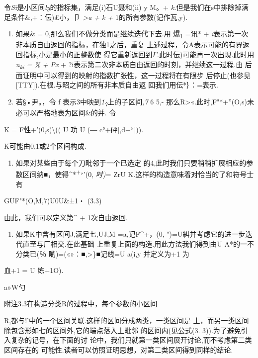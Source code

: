 \documentclass{article}
\begin{document}
令\emph{Si}是小区间\emph{ly}的指标集，满足(i)石U聂和(ii)
\textbar{}y\textbar{} M。+
\emph{k.}但是我们在s中排除掉满足条件\&,+：伝)£小，卩\textbar{}
\emph{\textgreater{}a + k +} 1的所有参数(记作瓦,y).

\begin{enumerate}
\def\labelenumi{(\alph{enumi})}
\item
  如果\& = 0,那么我们不做分类而是继续迭代下去.用 爆\textsubscript{1}
  =讯* + \emph{i}表示第一次非本质自由返回的指标，在独1之后，重复
  上述过程，令A表示可能的有界返回指标,小是最小的正整数使
  得它重新返回到\emph{I'}.此时伝)可能再一次出现.此时用\emph{n\textsubscript{ki}
  = \% + Px} + ?i表示第二次非本质自由返回的时刻，并继续这一过程.由
  后面证明中可以得到的映射的指数扩张性，这一过程将在有限步
  后停止(也参见{[}TTY{]}).在根.与昭之间的所有非本质自由返
  回我们用伝*｝：=表示.
\item
  若§•尹。，令 f 表示3中映到\emph{1\textsubscript{7}}上的子区间\emph{,7}
  6 5,-
  那么R\textbar{}\textgreater{}«.此时,F"*+''(O,s)未必可以严格地表为区间\&的并.
  令
\end{enumerate}

K = F性+'(0,s)\textbackslash{}(( U 功 U (― c°+砰{]},d+``{]})).

K可能由0,1或2个区间构成.

\begin{enumerate}
\def\labelenumi{(\arabic{enumi})}
\item
  如果对某些由于每个刀毗邻于一个已选定
  的4,此时我们只要稍稍扩展相应的参数区间纳■，使得\^{}*\textsuperscript{+，}'(0,
  \emph{吋)}= ZrU K.这样的构造意味着对恰当的了和符号士有
\end{enumerate}

GUF"*(O,M,7)U0U\&±1・ (3.3)

由此，我们可以定义第\^{} + 1次自由返回.

\begin{enumerate}
\def\labelenumi{(\arabic{enumi})}
\setcounter{enumi}{1}
\item
  如果K中含有区间J,满足七,UJ,M\textbar{} =a,记F\^{}+，(0,
  ")=U糾并考虑它的进一步迭代直至与厂相交.在此基础
  上重复上面的构造.用此方法我们得到由U A*的一不分类已(％
  啲)=(«»：■,\textgreater{}\}■记线=U a(i,y 并定义为+1 为
\end{enumerate}

血+1 = U 练+1O).

a»W勺

附注3.3在构造分类R的过程中，每个参数的小区间

R,都与!'中的一个区间关联.这样的区间分成两类，一类区间是
丄，而另一类区间除包含形如七的区间外,它的端点落入丄毗邻
的区间内(见公式(3. 3)).为了避免引入复杂的记号，在下面的讨
论中，我们只就第一类区间展开讨论,而不考虑第二类区间存在的
可能性.读者可以仿照证明思想，对第二类区间得到同样的结论.
\end{document}
